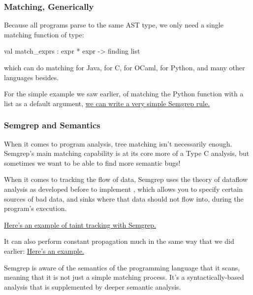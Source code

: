 \documentclass[aspectratio=169, handout]{beamer}
\begin{document}
\begin{frame}[fragile]
  \frametitle{Matching, Generically}

  Because all programs parse to the same AST type, we only need a single
  matching function of type:

  \begin{codeblock}
    val match_exprs : expr * expr -> finding list
  \end{codeblock}

  which can do matching for Java, for C, for OCaml, for Python, and many
  other languages besides.

  \pause
  \vspace{\fill}

  For the simple example we saw earlier, of matching the Python function with a
  list as a default argument,
  {\color{blue}\href{https://semgrep.dev/playground/s/JkjR}{we can write a very
  simple Semgrep rule.}}
\end{frame}

\begin{frame}[fragile]
  \frametitle{Semgrep and Semantics}

  When it comes to program analysis, tree matching isn't necessarily enough.
  Semgrep's main matching capability is at its core more of a Type C analysis,
  but sometimes we want to be able to find more semantic bugs!

  \pause
  \vspace{\fill}

  When it comes to tracking the flow of data, Semgrep uses the theory of
  dataflow analysis as developed before to implement ,
  which allows you to specify certain sources of bad data, and sinks where that
  data should not flow into, during the program's execution.

  {\color{blue}\href{https://semgrep.dev/playground/s/D1wq}{Here's an example of taint tracking with Semgrep.}}

  \pause
  \vspace{\fill}

  It can also perform constant propagation much in the same way that we did
  earlier:
  {\color{blue}\href{https://semgrep.dev/playground/s/4APL}{Here's an example.}}

  \pause
  \vspace{\fill}

  Semgrep is aware of the semantics of the programming language that it scans,
  meaning that it is not just a simple matching process. It's a
  syntactically-based analysis that is supplemented by deeper semantic analysis.
\end{frame}
\end{document}
